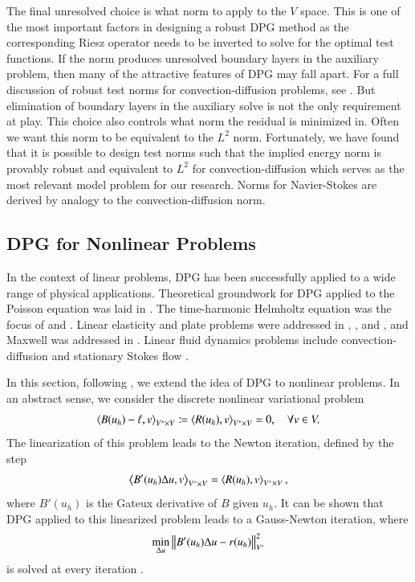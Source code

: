 \documentclass[preprint,12pt]{elsarticle}
\begin{document}
The final unresolved choice is what norm to apply to the $V$ space.
This is one of the most important factors in designing a robust DPG method as the corresponding Riesz operator 
needs to be inverted to solve for the optimal test functions.
If the norm produces unresolved boundary layers in the auxiliary problem, then many of the attractive features of DPG may fall apart.
For a full discussion of robust test norms for convection-diffusion problems, see \cite{DemkowiczHeuer,ChanHeuerThanhDemkowicz2012}.
But elimination of boundary layers in the auxiliary solve is not the only requirement at play. 
This choice also controls what norm the residual is minimized in. 
Often we want this norm to be equivalent to the $L^2$ norm.
Fortunately, we have found that it is possible to design test norms such that the implied energy norm 
is provably robust and equivalent to $L^2$ for convection-diffusion which
serves as the most relevant model problem for our research.
Norms for Navier-Stokes are derived by analogy to the convection-diffusion norm.

\subsection{DPG for Nonlinear Problems}
In the context of linear problems, DPG has been successfully applied to a wide range of physical applications.  
Theoretical groundwork for DPG applied to the Poisson equation was laid in \cite{DPGPoisson}.  The time-harmonic Helmholtz equation was the focus of \cite{DPGHelmholtz, Gopalakrishnan2014} and \cite{DPG4}.  Linear elasticity and plate problems were addressed in \cite{BramwellDPG}, \cite{NiemiBramwellDemkowicz10}, and \cite{BramwellDemkowiczQiu10}, and Maxwell was addressed in \cite{DPGCloaking, WohlmuthReport}.  Linear fluid dynamics problems include convection-diffusion\cite{DPG3,DemkowiczHeuer,ChanHeuerThanhDemkowicz2012,Chan2013,EllisLC} and stationary Stokes flow \cite{DPGStokes,EllisLC}.

In this section, following \cite{NateDissertation,JesseDissertation}, we extend the idea of DPG to nonlinear problems.  In an abstract sense, we consider the discrete nonlinear variational problem
\[
\left\langle B(u_h)-\ell,v \right\rangle_{V^*\times V} \coloneqq \left\langle R(u_h),v \right\rangle_{V^*\times V} = 0, \quad \forall v \in V.
\]
The linearization of this problem leads to the Newton iteration, defined by the step
\[
\left\langle B'(u_h)\Delta u,v \right\rangle_{V^*\times V} = \left\langle R(u_h),v \right\rangle_{V^*\times V},
\]
where $B'(u_h)$ is the Gateux derivative of $B$ given $u_h$.  It can be shown that DPG applied to this linearized problem leads to a Gauss-Newton iteration, where 
\[
\min_{\Delta u} \left\| B'(u_h)\Delta u - r(u_h) \right\|_{V'}^2
\]
is solved at every iteration \cite{Chan2013dpg}.  
\end{document}
